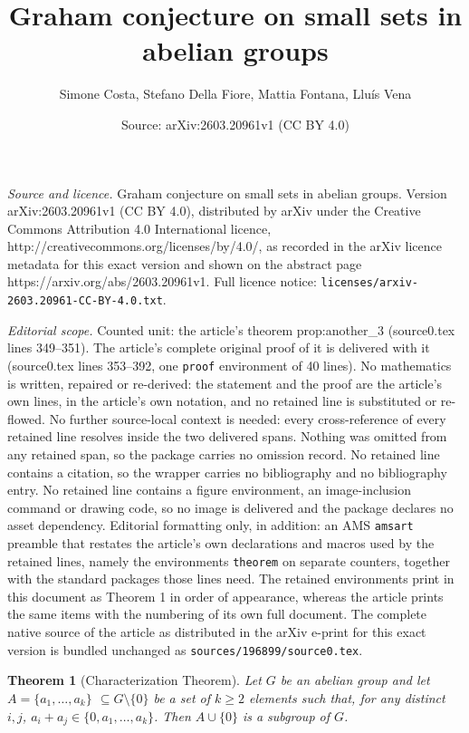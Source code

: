 \documentclass[10pt,a4paper]{amsart}
\title{Graham conjecture on small sets in abelian groups}
\author{Simone Costa, Stefano Della Fiore, Mattia Fontana, Llu\'is Vena}
\date{Source: arXiv:2603.20961v1 (CC BY 4.0)}
\newtheorem{theorem}{Theorem}
\begin{document}
\maketitle

\noindent\emph{Source and licence.} Graham conjecture on small sets in abelian groups. Version arXiv:2603.20961v1 (CC BY 4.0), distributed by arXiv under the Creative Commons Attribution 4.0 International licence, http://creativecommons.org/licenses/by/4.0/, as recorded in the arXiv licence metadata for this exact version and shown on the abstract page https://arxiv.org/abs/2603.20961v1. Full licence notice: \texttt{licenses/arxiv-2603.20961-CC-BY-4.0.txt}.\par\smallskip

\noindent\textit{Editorial scope.} Counted unit: the article's theorem prop:another\_3 (source0.tex lines 349--351). The article's complete original proof of it is delivered with it (source0.tex lines 353--392, one \texttt{proof} environment of 40 lines). No mathematics is written, repaired or re-derived: the statement and the proof are the article's own lines, in the article's own notation, and no retained line is substituted or re-flowed.  No further source-local context is needed: every cross-reference of every retained line resolves inside the two delivered spans.  Nothing was omitted from any retained span, so the package carries no omission record.  No retained line contains a citation, so the wrapper carries no bibliography and no bibliography entry.  No retained line contains a figure environment, an image-inclusion command or drawing code, so no image is delivered and the package declares no asset dependency.  Editorial formatting only, in addition: an AMS \texttt{amsart} preamble that restates the article's own declarations and macros used by the retained lines, namely the environments \texttt{theorem} on separate counters, together with the standard packages those lines need.  The retained environments print in this document as Theorem 1 in order of appearance, whereas the article prints the same items with the numbering of its own full document.  The complete native source of the article as distributed in the arXiv e-print for this exact version is bundled unchanged as \texttt{sources/196899/source0.tex}.
\begin{theorem}[Characterization Theorem]\label{prop:another_3}
	Let $G$ be an abelian group and let $A=\{a_1,\ldots,a_k\}$ $\subseteq G\setminus \{0\}$ be a set of $k\geq 2$ elements such that, for any distinct $i,j$, $a_i+a_j\in \{0,a_1,\ldots,a_k\}$. Then $A\cup \{0\}$  is a subgroup of $G$.
\end{theorem}
\end{document}
